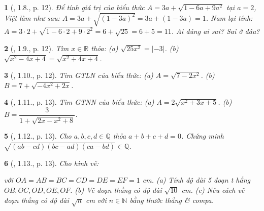 \documentclass{article}
\newtheorem{baitoan}{}%
\begin{document}
\begin{baitoan}[\cite{Binh_boi_duong_Toan_9_tap_1}, 1.8., p. 12]
	Để tính giá trị của biểu thức $A = 3a + \sqrt{1 - 6a + 9a^2}$ tại $a = 2$, Việt làm như sau: $A = 3a + \sqrt{(1 - 3a)^2} = 3a + (1 - 3a) = 1$. Nam lại tính: $A = 3\cdot2 + \sqrt{1 - 6\cdot2 + 9\cdot2^2} = 6 + \sqrt{25} = 6 + 5 = 11$. Ai đúng ai sai? Sai ở đâu?
\end{baitoan}

\begin{baitoan}[\cite{Binh_boi_duong_Toan_9_tap_1}, 1.9., p. 12]
	Tìm $x\in\mathbb{R}$ thỏa: (a) $\sqrt{25x^2} = |-3|$. (b) $\sqrt{x^2 - 4x + 4} = \sqrt{x^2 + 4x + 4}$.
\end{baitoan}

\begin{baitoan}[\cite{Binh_boi_duong_Toan_9_tap_1}, 1.10., p. 12]
	Tìm {\rm GTLN} của biểu thức: (a) $A = \sqrt{7 - 2x^2}$. (b) $B = 7 + \sqrt{-4x^2 + 2x}$.
\end{baitoan}

\begin{baitoan}[\cite{Binh_boi_duong_Toan_9_tap_1}, 1.11., p. 13]
	Tìm {\rm {\rm GTNN}} của biểu thức: (a) $A = 2\sqrt{x^2 + 3x + 5}$. (b) $B = \dfrac{3}{1 + \sqrt{2x - x^2 + 8}}$.
\end{baitoan}

\begin{baitoan}[\cite{Binh_boi_duong_Toan_9_tap_1}, 1.12., p. 13]
	Cho $a,b,c,d\in\mathbb{Q}$ thỏa $a + b + c + d = 0$. Chứng minh $\sqrt{(ab - cd)(bc - ad)(ca - bd)}\in\mathbb{Q}$.
\end{baitoan}

\begin{baitoan}[\cite{Binh_boi_duong_Toan_9_tap_1}, 1.13., p. 13]
	Cho hình vẽ:
	\begin{center}
	\end{center}
	với $OA = AB = BC = CD = DE = EF = 1$ {\rm cm}. (a) Tính độ dài 5 đoạn t hẳng $OB,OC,OD,OE,OF$. (b) Vẽ đoạn thẳng có độ dài $\sqrt{10}$ {\rm cm}. (c) Nêu cách vẽ đoạn thẳng có độ dài $\sqrt{n}$ {\rm cm} với $n\in\mathbb{N}$ bằng thước thẳng \& compa.
\end{baitoan}
\end{document}
